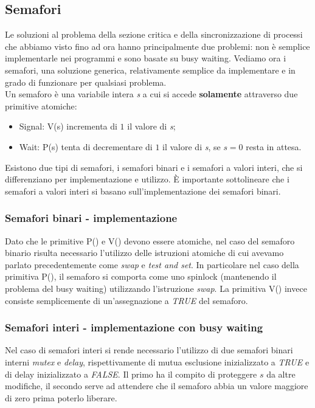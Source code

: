 \subsection{Semafori}
Le soluzioni al problema della sezione critica e della sincronizzazione di processi che abbiamo visto fino ad ora hanno principalmente due problemi: non è semplice implementarle nei programmi e sono basate su busy waiting. Vediamo ora i semafori, una soluzione generica, relativamente semplice da implementare e in grado di funzionare per qualsiasi problema. \\
Un semaforo è una variabile intera \emph{s} a cui si accede \textbf{solamente} attraverso due primitive atomiche:
\begin{itemize}
	\item Signal: V(s) incrementa di $1$ il valore di \emph{s};
	\item Wait: P(s) tenta di decrementare di $1$ il valore di \emph{s}, se $s = 0$ resta in attesa.
\end{itemize}
Esistono due tipi di semafori, i semafori binari e i semafori a valori interi, che si differenziano per implementazione e utilizzo. È importante sottolineare che i semafori a valori interi si basano sull'implementazione dei semafori binari.

\subsubsection{Semafori binari - implementazione}
Dato che le primitive P() e V() devono essere atomiche, nel caso del semaforo binario risulta necessario l'utilizzo delle istruzioni atomiche di cui avevamo parlato precedentemente come \emph{swap} e \emph{test and set}. In particolare nel caso della primitiva P(), il semaforo si comporta come uno spinlock (mantenendo il problema del busy waiting) utilizzando l'istruzione \emph{swap}.
La primitiva V() invece consiste semplicemente di un'assegnazione a \emph{TRUE} del semaforo.

\subsubsection{Semafori interi - implementazione con busy waiting}
Nel caso di semafori interi si rende necessario l'utilizzo di due semafori binari interni \emph{mutex} e \emph{delay}, rispettivamente di mutua esclusione inizializzato a \emph{TRUE} e di delay inizializzato a \emph{FALSE}. Il primo ha il compito di proteggere $s$ da altre modifiche, il secondo serve ad attendere che il semaforo abbia un valore maggiore di zero prima poterlo liberare.

